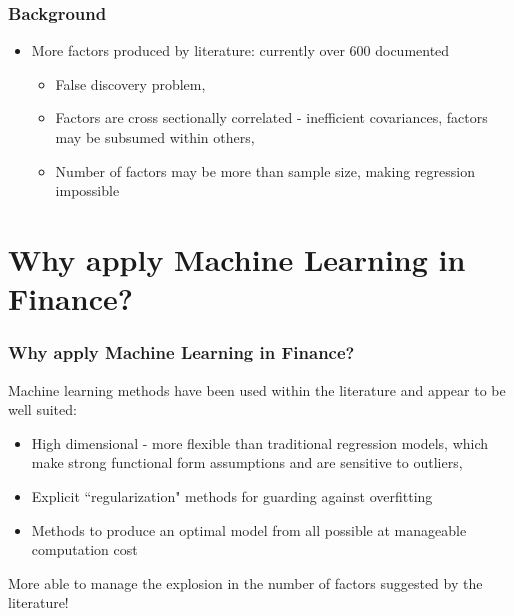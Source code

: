 \documentclass[aspectratio=169]{beamer}
\begin{document}
\begin{frame}
\frametitle{Background}
\begin{itemize}
\item More factors produced by literature: currently over 600 documented \citep{harvey_census_2019}
\begin{itemize}
	\item False discovery problem, \citep{harvey__2016}
	
	\item Factors are cross sectionally correlated - inefficient covariances, factors may be subsumed within others, \citep{feng_taming_2019}
	
	\item Number of factors may be more than sample size, making regression impossible
\end{itemize}
\end{itemize}
\end{frame}

\section{Why apply Machine Learning in Finance?}


\begin{frame}
\frametitle{Why apply Machine Learning in Finance?}

Machine learning methods have been used within the literature and appear to be well suited:
\begin{itemize}
	\item High dimensional - more flexible than traditional regression models, which make strong functional form assumptions and are sensitive to outliers, \citep{freyberger_dissecting_2017}
	\item Explicit ``regularization" methods for guarding against overfitting
	\item Methods to produce an optimal model from all possible at manageable computation cost
\end{itemize}
More able to manage the explosion in the number of factors suggested by the literature!
\end{frame}
\end{document}
